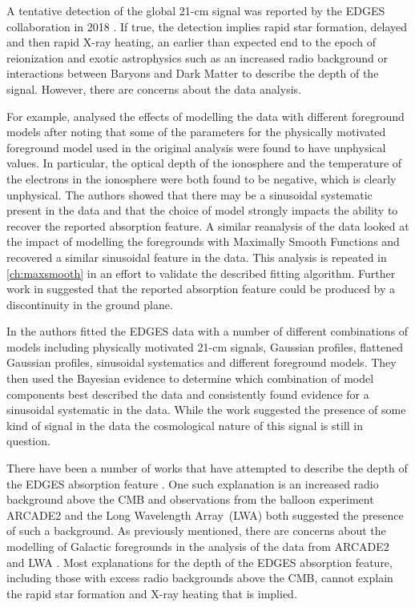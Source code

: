 A tentative detection of the global 21-cm signal was reported by the EDGES collaboration in 2018 \cite{Bowman_edges_2018}. If true, the detection implies rapid star formation, delayed and then rapid X-ray heating, an earlier than expected end to the epoch of reionization and exotic astrophysics such as an increased radio background \cite{FengRB2018, JanaRB2018, EwallRB2018, MirochaRB2019, Reis2020} or interactions between Baryons and Dark Matter \cite{MunozDM2018, KovetzDM2018, BarkanaDM2018, SlatyerDM2018, Berlin_DM_2018, Barkana_DM_2018} to describe the depth of the signal. However, there are concerns about the data analysis.

For example, \cite{Hills2018} analysed the effects of modelling the data with different foreground models after noting that some of the parameters for the physically motivated foreground model used in the original analysis were found to have unphysical values. In particular, the optical depth of the ionosphere and the temperature of the electrons in the ionosphere were both found to be negative, which is clearly unphysical. The authors showed that there may be a sinusoidal systematic present in the data and that the choice of model strongly impacts the ability to recover the reported absorption feature. A similar reanalysis of the data looked at the impact of modelling the foregrounds with Maximally Smooth Functions \cite{Singh_edges_2019} and recovered a similar sinusoidal feature in the data. This analysis is repeated in \cref{ch:maxsmooth} in an effort to validate the described fitting algorithm. Further work in \cite{Bradley_EDGES_2019} suggested that the reported absorption feature could be produced by a discontinuity in the ground plane.

In \cite{Sims2020} the authors fitted the EDGES data with a number of different combinations of models including physically motivated 21-cm signals, Gaussian profiles, flattened Gaussian profiles, sinusoidal systematics and different foreground models. They then used the Bayesian evidence to determine which combination of model components best described the data and consistently found evidence for a sinusoidal systematic in the data. While the work suggested the presence of some kind of signal in the data the cosmological nature of this signal is still in question.

There have been a number of works that have attempted to describe the depth of the EDGES absorption feature \cite[e.g.][]{Fialkov2019, Reis_sta_2021, MunozDM2018, Barkana_DM_2018, KovetzDM2018}. One such explanation is an increased radio background above the CMB and observations from the balloon experiment ARCADE2 \cite{fixsen_arcade_2011} and the Long Wavelength Array~(LWA) \cite{dowell_radio_2018} both suggested the presence of such a background. As previously mentioned, there are concerns about the modelling of Galactic foregrounds in the analysis of the data from ARCADE2 and LWA \cite{Subrahmanyan2013}. Most explanations for the depth of the EDGES absorption feature, including those with excess radio backgrounds above the CMB, cannot explain the rapid star formation and X-ray heating that is implied. 

